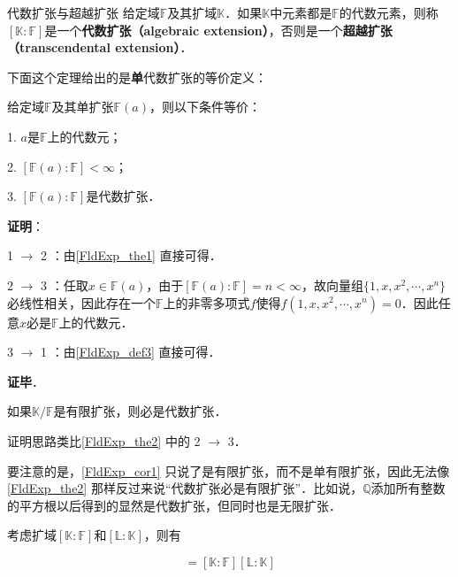 \begin{definition}{代数扩张与超越扩张}\label{FldExp_def3}
给定域$\mathbb{F}$及其扩域$\mathbb{K}$．如果$\mathbb{K}$中元素都是$\mathbb{F}$的代数元素，则称$[\mathbb{K}:\mathbb{F}]$是一个\textbf{代数扩张（algebraic extension）}，否则是一个\textbf{超越扩张（transcendental extension）}．
\end{definition}

下面这个定理给出的是\textbf{单}代数扩张的等价定义：

\begin{theorem}{}\label{FldExp_the2}
给定域$\mathbb{F}$及其单扩张$\mathbb{F}(a)$，则以下条件等价：

1. $a$是$\mathbb{F}$上的代数元；

2. $[\mathbb{F}(a):\mathbb{F}]<\infty$；

3. $[\mathbb{F}(a):\mathbb{F}]$是代数扩张．

\end{theorem}


\textbf{证明}：

1 $\to$ 2 ：由\autoref{FldExp_the1} 直接可得．

2 $\to$ 3 ：任取$x\in\mathbb{F}(a)$，由于$[\mathbb{F}(a):\mathbb{F}]=n<\infty$，故向量组$\{1, x, x^2, \cdots, x^n\}$必线性相关，因此存在一个$\mathbb{F}$上的非零多项式$f$使得$f(1, x, x^2, \cdots, x^n)=0$．因此任意$x$必是$\mathbb{F}$上的代数元．

3 $\to$ 1 ：由\autoref{FldExp_def3} 直接可得．

\textbf{证毕}．

\begin{corollary}{}\label{FldExp_cor1}
如果$\mathbb{K}/\mathbb{F}$是有限扩张，则必是代数扩张．
\end{corollary}

证明思路类比\autoref{FldExp_the2} 中的 2 $\to$ 3．

要注意的是，\autoref{FldExp_cor1} 只说了是有限扩张，而不是单有限扩张，因此无法像\autoref{FldExp_the2} 那样反过来说“代数扩张必是有限扩张”．比如说，$\mathbb{Q}$添加所有整数的平方根以后得到的显然是代数扩张，但同时也是无限扩张．





\begin{theorem}{}\label{FldExp_the3}
考虑扩域$[\mathbb{K}:\mathbb{F}]$和$[\mathbb{L}:\mathbb{K}]$，则有

\begin{equation}
[\mathbb{L}:\mathbb{F}]=[\mathbb{K}:\mathbb{F}][\mathbb{L}:\mathbb{K}]
\end{equation}

\end{theorem}

